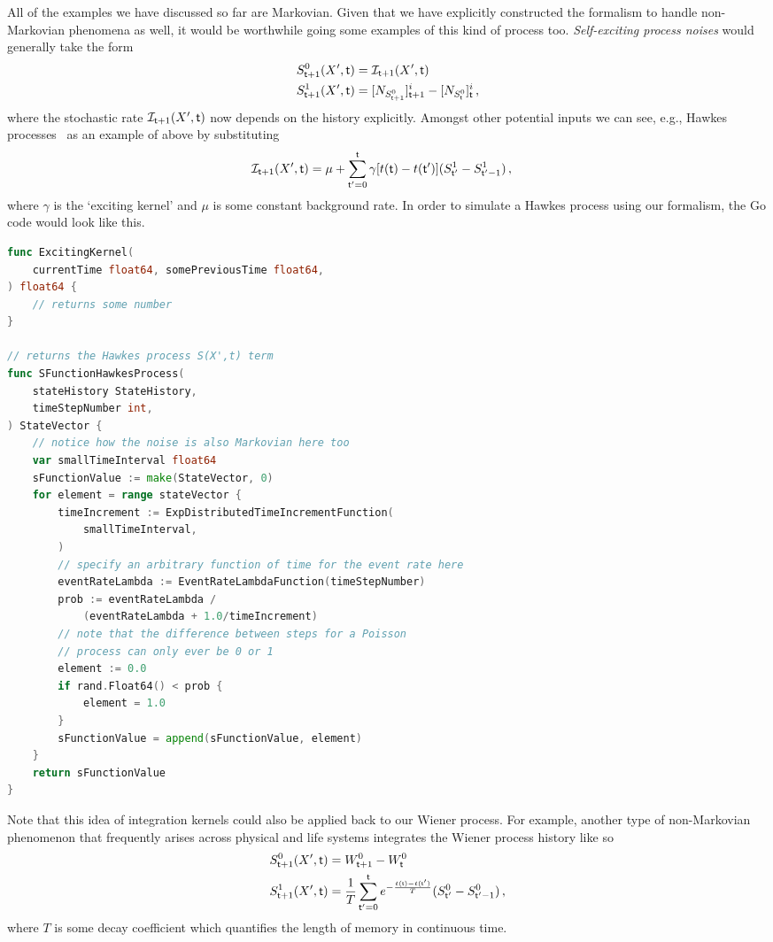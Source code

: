 \documentclass{book}
\begin{document}
All of the examples we have discussed so far are Markovian. Given that we have explicitly constructed the formalism to handle non-Markovian phenomena as well, it would be worthwhile going some examples of this kind of process too. \emph{Self-exciting process noises} would generally take the form
\begin{align}
S^{0}_{{\sf t}+1}(X',{\sf t}) &= {\cal I}_{{\sf t}+1} (X',{\sf t}) \\
S^{1}_{{\sf t}+1}(X',{\sf t}) &= [N_{S^{0}_{{\sf t}+1}}]^i_{{\sf t}+1}-[N_{S^{0}_{{\sf t}}}]^i_{\sf t} \,,
\end{align}
where the stochastic rate ${\cal I}_{{\sf t}+1} (X',{\sf t})$ now depends on the history explicitly. Amongst other potential inputs we can see, e.g., Hawkes processes~\cite{hawkes1971spectra} as an example of above by substituting 
\begin{align}
{\cal I}_{{\sf t}+1} (X',{\sf t}) &= \mu + \sum^{{\sf t}}_{{\sf t}'=0}\gamma [t({\sf t})-t({\sf t}')](S^{1}_{{\sf t}'}-S^{1}_{{\sf t}'-1}) \,,
\end{align}
where $\gamma$ is the `exciting kernel' and $\mu$ is some constant background rate. In order to simulate a Hawkes process using our formalism, the Go code would look like this.

\begin{lstlisting}[language=Go]
func ExcitingKernel(
    currentTime float64, somePreviousTime float64,
) float64 {
	// returns some number
}

// returns the Hawkes process S(X',t) term
func SFunctionHawkesProcess(
    stateHistory StateHistory,
    timeStepNumber int,
) StateVector {
    // notice how the noise is also Markovian here too
    var smallTimeInterval float64
    sFunctionValue := make(StateVector, 0)
    for element = range stateVector {
        timeIncrement := ExpDistributedTimeIncrementFunction(
            smallTimeInterval,
        )
        // specify an arbitrary function of time for the event rate here
        eventRateLambda := EventRateLambdaFunction(timeStepNumber)
        prob := eventRateLambda /
            (eventRateLambda + 1.0/timeIncrement)
        // note that the difference between steps for a Poisson
        // process can only ever be 0 or 1
        element := 0.0
        if rand.Float64() < prob {
            element = 1.0
        }
        sFunctionValue = append(sFunctionValue, element)
    }
    return sFunctionValue
}
\end{lstlisting}

Note that this idea of integration kernels could also be applied back to our Wiener process. For example, another type of non-Markovian phenomenon that frequently arises across physical and life systems integrates the Wiener process history like so
\begin{align}
S^{0}_{{\sf t}+1}(X',{\sf t}) &= W^0_{{\sf t}+1}-W^0_{\sf t}\\
S^{1}_{{\sf t}+1}(X',{\sf t}) &= \frac{1}{T}\sum^{{\sf t}}_{{\sf t}'=0}e^{-\frac{t({\sf t})-t({\sf t}')}{T}} (S^{0}_{{\sf t}'}-S^{0}_{{\sf t}'-1}) \,,
\end{align}
where $T$ is some decay coefficient which quantifies the length of memory in continuous time.
\end{document}
